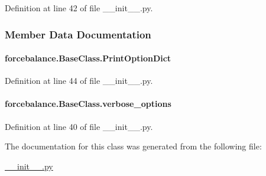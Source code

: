 Definition at line 42 of file \-\_\-\-\_\-init\-\_\-\-\_\-.\-py.



\subsubsection{Member Data Documentation}
\hypertarget{classforcebalance_1_1BaseClass_afc6659278497d7245bc492ecf405ccae}{
\paragraph[{Print\-Option\-Dict}]{\setlength{\rightskip}{0pt plus 5cm}forcebalance.\-Base\-Class.\-Print\-Option\-Dict}}\label{classforcebalance_1_1BaseClass_afc6659278497d7245bc492ecf405ccae}


Definition at line 44 of file \-\_\-\-\_\-init\-\_\-\-\_\-.\-py.

\hypertarget{classforcebalance_1_1BaseClass_afd68efa29ccd2f320f4cf82198214aac}{
\paragraph[{verbose\-\_\-options}]{\setlength{\rightskip}{0pt plus 5cm}forcebalance.\-Base\-Class.\-verbose\-\_\-options}}\label{classforcebalance_1_1BaseClass_afd68efa29ccd2f320f4cf82198214aac}


Definition at line 40 of file \-\_\-\-\_\-init\-\_\-\-\_\-.\-py.



The documentation for this class was generated from the following file\-:\begin{DoxyCompactItemize}
\item 
\hyperlink{____init_____8py}{\-\_\-\-\_\-init\-\_\-\-\_\-.\-py}\end{DoxyCompactItemize}
